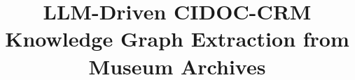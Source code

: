 \documentclass[a4, conference]{IEEEtran}
\begin{document}
%
\title{LLM-Driven CIDOC-CRM Knowledge Graph Extraction from Museum Archives}



% 
\end{document}
